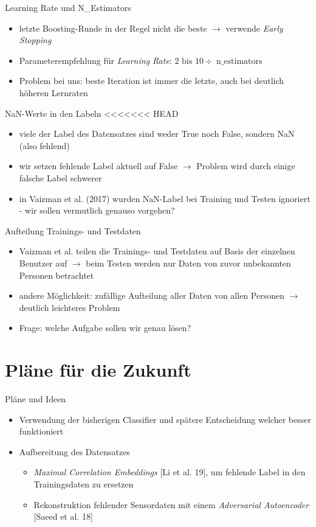 \documentclass[10pt,%
	wide,%
	xcolor={x11names},%
	hyperref={colorlinks},%
	pantone312,%
	handout,%
	]{beamer}
\begin{document}
\begin{frame}[t]{Learning Rate und N\_Estimators}
	\begin{itemize}
		\item letzte Boosting-Runde in der Regel nicht die beste $\rightarrow$ verwende \emph{Early Stopping}
		\item Parameterempfehlung für \emph{Learning Rate}: $2 \text{ bis } 10 \div \operatorname{n\_estimators}$
		\item Problem bei uns: beste Iteration ist immer die letzte, auch bei deutlich höheren Lernraten
	\end{itemize}
\end{frame}

\begin{frame}[t]{NaN-Werte in den Labeln}
<<<<<<< HEAD
	\begin{itemize}
		\item viele der Label des Datensatzes sind weder True noch False, sondern NaN (also fehlend)
		\item wir setzen fehlende Label aktuell auf False $\rightarrow$ Problem wird durch einige falsche Label schwerer
		\item in Vaizman et al. (2017) wurden NaN-Label bei Training und Testen ignoriert - wir sollen vermutlich genauso vorgehen?
	\end{itemize}
\end{frame}

\begin{frame}[t]{Aufteilung Trainings- und Testdaten}
	\begin{itemize}
		\item Vaizman et al. teilen die Trainings- und Testdaten auf Basis der einzelnen Benutzer auf $\rightarrow$ beim Testen werden nur Daten von zuvor unbekannten Personen betrachtet
		\item andere Möglichkeit: zufällige Aufteilung aller Daten von allen Personen $\rightarrow$ deutlich leichteres Problem
		\item Frage: welche Aufgabe sollen wir genau lösen?
	\end{itemize}
\end{frame}

\section{Pläne für die Zukunft}

\begin{frame}[t]{Pläne und Ideen}
	\begin{itemize}
		\item Verwendung der bisherigen Classifier und spätere Entscheidung welcher besser funktioniert
		\item Aufbereitung des Datensatzes
		\begin{itemize}
			\item \emph{Maximal Correlation Embeddings} [Li et al. 19], um fehlende Label in den Trainingsdaten zu ersetzen
			\item Rekonstruktion fehlender Sensordaten mit einem \emph{Adversarial Autoencoder} [Saeed et al. 18]
		\end{itemize}
	\end{itemize}
\end{frame}
\end{document}
